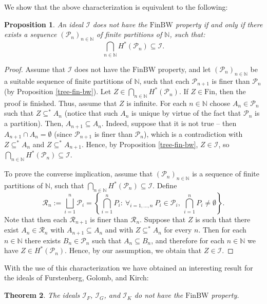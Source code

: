 \documentclass{amsart}
\newtheorem{thm}{Theorem}[section]
\newtheorem{prop}[thm]{Proposition}
\theoremstyle{definition}
\newcommand{\N}{{\mathbb N}}
\newcommand{\Fin}{\textrm{Fin}}
\newcommand{\I}{\mathcal I}
\newcommand{\finbw}{\text{FinBW}}
\begin{document}
We show that the above characterization is equivalent to the following:

\begin{prop}
An ideal $\I$ does not have the $\finbw$ property if and only if there exists a sequence $(\mathcal{P}_n)_{n\in\N}$ of finite partitions of $\N$, such that: 
$$\bigcap_{n\in\N}{H^{*}(\mathcal{P}_n)}\subseteq\I.$$
\end{prop}

\begin{proof}
Assume that $\I$ does not have the $\finbw$ property, and let $(\mathcal{P}_n)_{n\in\N}$ be a suitable sequence of finite partitions of $\N$, such that each $\mathcal{P}_{n+1}$ is finer than $\mathcal{P}_n$ (by Proposition \ref{tree-fin-bw}). Let $Z \in \bigcap_{n\in\N}{H^{*}(\mathcal{P}_n)}$. If $Z\in\Fin$, then the proof is finished. Thus, assume that $Z$ is infinite. For each $n\in\N$ choose $A_n\in \mathcal{P}_n$ such that $Z \subseteq^* A_n$ (notice that such $A_n$ is unique by virtue of the fact that $\mathcal{P}_n$ is a partition). Then, $A_{n+1} \subseteq A_n$. Indeed, suppose that it is not true -- then $A_{n+1} \cap A_n = \emptyset$ (since $\mathcal{P}_{n+1}$ is finer than $\mathcal{P}_n$), which is a contradiction with $Z \subseteq^* A_n$ and $Z \subseteq^* A_{n+1}$. Hence, by Proposition \ref{tree-fin-bw}, $Z\in\I$, so $\bigcap_{n\in\N}{H^{*}(\mathcal{P}_n)} \subseteq \I$.

To prove the converse implication, assume that $(\mathcal{P}_n)_{n\in\N}$ is a sequence of finite partitions of $\N$, such that $\bigcap_{n\in\N}{H^{*}(\mathcal{P}_n)} \subseteq \I$. Define 
$$\mathcal{R}_n := \bigsqcup_{i=1}^{n}{\mathcal{P}_i} = \left\{\bigcap_{i=1}^{n}{P_i} :\ \forall_{i=1,\ldots,n}\ P_i\in\mathcal{P}_i,\ \bigcap_{i=1}^{n}{P_i}\neq\emptyset\right\}.$$
Note that then each $\mathcal{R}_{n+1}$ is finer than $\mathcal{R}_n$.
Suppose that $Z$ is such that there exist $A_n \in \mathcal{R}_n$ with $A_{n+1} \subseteq A_n$ and with $Z \subseteq^* A_n$ for every $n$. Then for each $n\in\N$ there exists $B_n \in \mathcal{P}_n$ such that $A_n \subseteq B_n$, and therefore for each $n\in\N$ we have $Z \in H^{*}(\mathcal{P}_n)$. Hence, by our assumption, we obtain that $Z\in\I$.
\end{proof}

With the use of this characterization we have obtained an interesting result for the ideals of Furstenberg, Golomb, and Kirch:

\begin{thm}
The ideals $\I_F$, $\I_G$, and $\I_K$ do not have the $\finbw$ property.
\end{thm}
\end{document}
